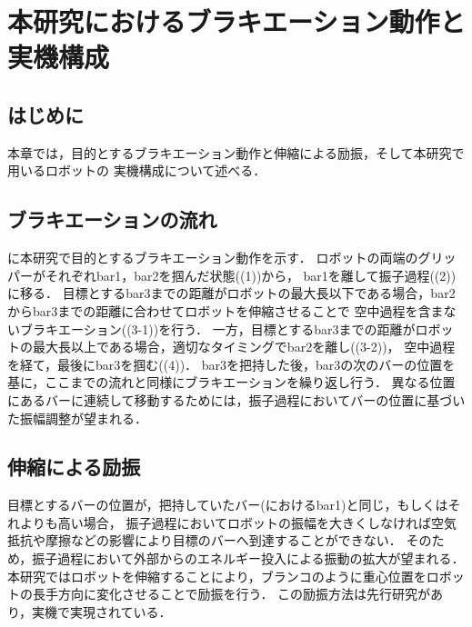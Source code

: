 \chapter[本研究におけるブラキエーション動作と実機構成]%
        {本研究におけるブラキエーション動作と\\実機構成}
        \section{はじめに}
          
          本章では，目的とするブラキエーション動作と伸縮による励振，そして本研究で用いるロボットの
          実機構成について述べる．


        \section{ブラキエーションの流れ}

          に本研究で目的とするブラキエーション動作を示す．
          ロボットの両端のグリッパーがそれぞれbar1，bar2を掴んだ状態((1))から，
          bar1を離して振子過程((2))に移る．
          目標とするbar3までの距離がロボットの最大長以下である場合，bar2からbar3までの距離に合わせてロボットを伸縮させることで
          空中過程を含まないブラキエーション((3-1))を行う．
          一方，目標とするbar3までの距離がロボットの最大長以上である場合，適切なタイミングでbar2を離し((3-2))，
          空中過程を経て，最後にbar3を掴む((4))．
          bar3を把持した後，bar3の次のバーの位置を基に，ここまでの流れと同様にブラキエーションを繰り返し行う．
          異なる位置にあるバーに連続して移動するためには，振子過程においてバーの位置に基づいた振幅調整が望まれる．

        
        \section{伸縮による励振}
          
          目標とするバーの位置が，把持していたバー(におけるbar1)と同じ，もしくはそれよりも高い場合，
          振子過程においてロボットの振幅を大きくしなければ空気抵抗や摩擦などの影響により目標のバーへ到達することができない．
          そのため，振子過程において外部からのエネルギー投入による振動の拡大が望まれる．
          本研究ではロボットを伸縮することにより，ブランコのように重心位置をロボットの長手方向に変化させることで励振を行う．
          この励振方法は先行研究があり，実機で実現されている\cite{Hijiri:Robomech2024}．
